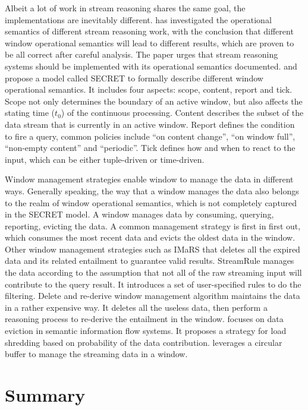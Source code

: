 Albeit a lot of work in stream reasoning shares the same goal, the implementations are inevitably different.   
\cite{dell2013correctness} has investigated the operational semantics of different stream reasoning work, with the conclusion that different window operational semantics will lead to different results, which are proven to be all correct after careful analysis.
The paper urges that stream reasoning systems should be implemented with its operational semantics documented. 
\cite{botan2010secret} and \cite{dindar2013modeling} propose a model called SECRET to formally describe different window operational semantics.
It includes four aspects: scope, content, report and tick. 
Scope not only determines the boundary of an active window, but also affects the stating time ($t_{0}$) of the continuous processing.
Content describes the subset of the data stream that is currently in an active window.
Report defines the condition to fire a query, common policies include ``on content change'', ``on window full'', ``non-empty content'' and ``periodic''.
Tick defines how and when to react to the input, which can be either tuple-driven or time-driven.

Window management strategies enable window to manage the data in different ways. 
Generally speaking, the way that a window manages the data also belongs to the realm of window operational semantics, which is not completely captured in the SECRET model.
A window manages data by consuming, querying, reporting, evicting the data. 
A common management strategy is first in first out, which consumes the most recent data and evicts the oldest data in the window. 
Other window management strategies such as IMaRS \cite{barbieri2010incremental} that deletes all the expired data and its related entailment to guarantee valid results. 
StreamRule \cite{mileo2013streamrule} manages the data according to the assumption that not all of the raw streaming input will contribute to the query result. 
It introduces a set of user-specified rules to do the filtering. 
Delete and re-derive window management algorithm \cite{volz2005incrementally} maintains the data in a rather expensive way. 
It deletes all the useless data, then perform a reasoning process to re-derive the entailment in the window.
\cite{nguyen2013eviction} focuses on data eviction in semantic information flow systems. 
It proposes a strategy for load shredding based on probability of the data contribution.
\cite{gao2014clock} leverages a circular buffer to manage the streaming data in a window. 
%
\section{Summary}

